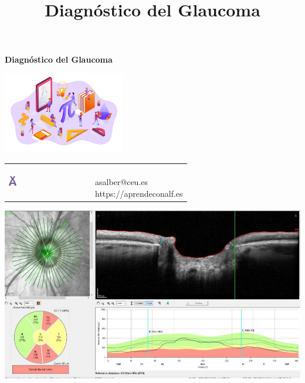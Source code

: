 \documentclass[
  a4paper,
]{scrreport}
\title{Diagnóstico del Glaucoma}
\author{}
\date{}
\begin{document}
\begin{titlepage}

\begin{center}
\vspace*{5cm}

\Huge
{\textbf{\textsf{Diagnóstico del Glaucoma}}}

\vspace{0.5cm}
\LARGE
{\textbf{\textsf{}}}

\vspace{1.5cm}

\includegraphics[width=0.4\textwidth]{../img/logos/proyectos.png}
\end{center}

\vfill

\begin{flushleft}
\begin{tabular}{ll}
\includegraphics[width=0.1\textwidth]{../img/logos/aprendeconalf.png} & \parbox[b]{5cm}{\Large\textsf{}\\ \textsf{asalber@ceu.es} \\ \textsf{https://aprendeconalf.es}}
\end{tabular}
\end{flushleft}
\end{titlepage}\ifdefined\Shaded\renewenvironment{Shaded}{\begin{tcolorbox}[boxrule=0pt, enhanced, interior hidden, breakable, frame hidden, borderline west={3pt}{0pt}{shadecolor}, sharp corners]}{\end{tcolorbox}}\fi

\includegraphics{../img/glaucoma/oct.jpg}
\end{document}
